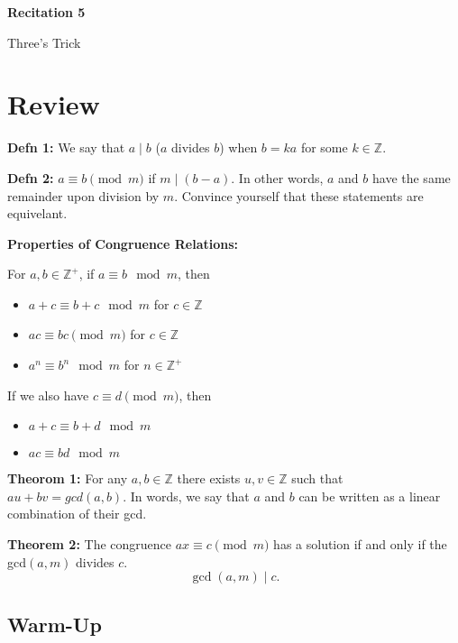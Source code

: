 \documentclass[12pt,letterpaper]{article}
\newcommand\Z{\mathbb Z}
\begin{document}
  \thispagestyle{firstpagestyle}
  \begin{center}
    {\large \textbf{Recitation 5}}
    
    {\large Three's Trick}
  \end{center}
  
   \section*{Review}	
	
	\textbf{Defn 1:} We say that $a \mid b$ ($a$ divides $b$) when $b = ka$ for some $k \in \Z$. 

	\textbf{Defn 2:} $a \equiv b \pmod m$ if $m \mid (b-a)$. In other words, $a$ and $b$ have the same remainder upon division by $m$. Convince yourself that these statements are equivelant. 

\textbf{Properties of Congruence Relations:}

For $a,b \in \mathbb{Z}^+$, if $a \equiv b \mod{m}$, then
\begin{itemize}
    \item $a + c\equiv b + c\mod{m}$ for $c \in \mathbb{Z}$
    \item $ac \equiv bc \pmod{m}$ for $c \in \mathbb{Z}$
    \item $a^n \equiv b^n \mod{m}$ for $n \in \mathbb{Z^+}$
\end{itemize}
If we also have $c \equiv d \pmod{m}$, then
\begin{itemize}
    \item $a + c\equiv b + d\mod{m}$
    \item $ac\equiv bd\mod{m}$
\end{itemize}

\textbf{Theorom 1:} For any $a,b \in \Z$ there exists $u,v \in \Z$ such that $au + bv = gcd(a,b)$. In words, we say that $a$ and $b$ can be written as a linear combination of their gcd.

\textbf{Theorem 2:} The congruence $ax \equiv c \pmod{m}$ has a solution if and only if the gcd$(a,m)$ divides $c$. 
\[
\gcd(a,m) \mid c.
\]

 
	\subsection*{Warm-Up}
\end{document}
